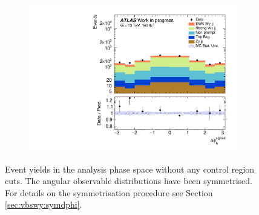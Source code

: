 \begin{figure}[htpb]
\begin{subfigure}[b]{0.48\textwidth}
    \caption{}
\end{subfigure}
\hfill
\begin{subfigure}[b]{0.48\textwidth}
    \centering
    \includegraphics[width=\textwidth]{plots/diffx/combined_stacks/data_vs_mc_lepgam_dphi.pdf}
    \caption{}
\end{subfigure}
\caption{Event yields in the analysis phase space without any control region cuts. The angular observable distributions have been symmetrised. For details on the symmetrisation procedure see Section \ref{sec:vbswy:symdphi}.\label{fig:vbswy:mcdatayields}}
\end{figure}
%

